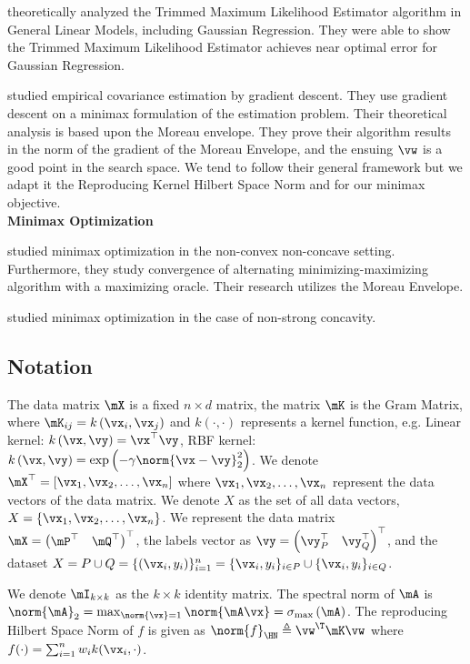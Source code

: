 \documentclass{article} %
\theoremstyle{plain}
\theoremstyle{definition}
\theoremstyle{remark}
\begin{document}
	\citep{awasthi:2022} theoretically analyzed the Trimmed Maximum Likelihood Estimator algorithm in General Linear Models, including Gaussian Regression. They were able to show the Trimmed Maximum Likelihood Estimator achieves near optimal error for Gaussian Regression.
	
	\citep{cheng:2020} studied empirical covariance estimation by gradient descent. They use gradient descent on a minimax formulation of the estimation problem. Their theoretical analysis is based upon the Moreau envelope. They prove their algorithm results in the norm of the gradient of the Moreau Envelope, and the ensuing $\vw$ is a good point in the search space. We tend to follow their general framework but we adapt it the Reproducing Kernel Hilbert Space Norm and for our minimax objective. 
	\\
	\textbf{Minimax Optimization}
	
	\citep{jin:2019} studied minimax optimization in the non-convex non-concave setting. Furthermore, they study convergence of alternating minimizing-maximizing algorithm with a maximizing oracle. Their research utilizes the Moreau Envelope. 
	
	\citep{yang2022} studied minimax optimization in the case of non-strong concavity. 
	
	\subsection{Notation}
	The data matrix $\mX$ is a fixed $n \times d$ matrix, the matrix $\mK$ is the Gram Matrix, where $\mK_{ij} = k\left(\vx_i,\vx_j\right)$ and $k(\cdot,\cdot)$ represents a kernel function, e.g. Linear kernel: $k\left(\vx,\vy\right) = \vx^\top\vy$, RBF kernel: $k\left(\vx,\vy\right) = \exp\left(-\gamma \norm{\vx-\vy}_2^2\right)$. We denote $\mX^\top = \left[\vx_1,\vx_2,\dots,\vx_n\right]$ where $\vx_1,\vx_2,\dots,\vx_n$ represent the data vectors of the data matrix. We denote $X$ as the set of all data vectors, $X = \left\{\vx_1,\vx_2,\ldots,\vx_n\right\}$. We represent the data matrix $\mX = \begin{pmatrix}
		\mP^\top & \mQ^\top
	\end{pmatrix}^\top$, the labels vector as $ \vy = \begin{pmatrix} \vy_P^\top & \vy_Q^\top \end{pmatrix}^\top$, and the dataset $X = P \cup Q =  \{(\vx_i,y_i)\}_{i=1}^n = \{\vx_i, y_i\}_{i \in P} \cup \{\vx_i,y_i\}_{i \in Q}$.
	
	We denote $\mI_{k\times k}$ as the $k \times k$ identity matrix. The spectral norm of $\mA$ is $\norm{\mA}_2 = \max_{\norm{\vx}=1}\norm{\mA\vx}=\sigma_{\max}\left(\mA\right)$. The reproducing Hilbert Space Norm of $f$ is given as $\norm{f}_{\HN} \triangleq \vw^{\T}\mK\vw$ where $f(\cdot) = \sum_{i=1}^n w_ik(\vx_i, \cdot)$. 
	
\end{document}
